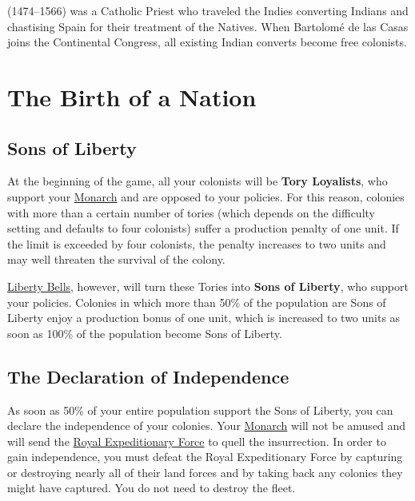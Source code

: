 \documentclass[12pt]{book}
\begin{document}
(1474--1566) was a Catholic Priest who traveled the Indies converting
Indians and chastising Spain for their treatment of the Natives. When
Bartolom\'e de las Casas joins the Continental Congress, all existing
Indian converts become free
colonists. 



\hypertarget{The Birth of a Nation}{\chapter{The Birth of a Nation}}

\hypertarget{Sons of Liberty}{\section{Sons of Liberty}}

At the beginning of the game, all your colonists will be
\hypertarget{Tories}{\textbf{Tory Loyalists}}, who support your
\hyperlink{Monarch}{Monarch} and are opposed to your policies. For
this reason, colonies with more than a certain number of tories (which
depends on the difficulty setting and defaults to four colonists)
suffer a production penalty of one unit. If the limit is exceeded by
four colonists, the penalty increases to two units and may well
threaten the survival of the colony.

\hyperlink{Liberty Bells}{Liberty Bells}, however, will turn these
Tories into \textbf{Sons of Liberty}, who support your
policies. Colonies in which more than 50\% of the population are Sons
of Liberty enjoy a production bonus of one unit, which is increased to
two units as soon as 100\% of the population become Sons of Liberty.


\hypertarget{Declaration of Independence}{\section{The Declaration
of Independence}}

As soon as 50\% of your entire population support the Sons of Liberty,
you can declare the independence of your colonies.  Your
\hyperlink{Monarch}{Monarch} will not be amused and will send the
\hyperlink{Royal Expeditionary Force}{Royal Expeditionary Force} to
quell the insurrection. In order to gain independence, you must defeat
the Royal Expeditionary Force by capturing or destroying nearly all of
their land forces and by taking back any colonies they might have
captured. You do not need to destroy the fleet.
\end{document}

